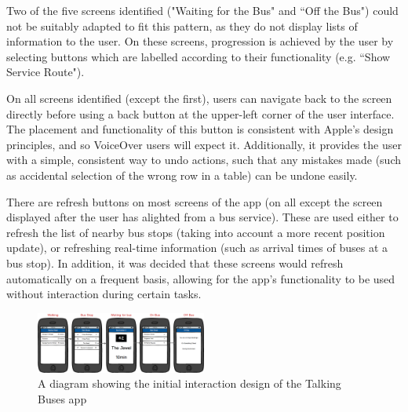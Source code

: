 \documentclass[10pt,twocolumn]{article}
\begin{document}
Two of the five screens identified ("Waiting for the Bus" and ``Off the Bus") could not be suitably adapted to fit this pattern, as they do not display lists of information to the user. On these screens, progression is achieved by the user by selecting buttons which are labelled according to their functionality (e.g. ``Show Service Route").

On all screens identified (except the first), users can navigate back to the screen directly before using a back button at the upper-left corner of the user interface. The placement and functionality of this button is consistent with Apple's design principles, and so VoiceOver users will expect it. Additionally, it provides the user with a simple, consistent way to undo actions, such that any mistakes made (such as accidental selection of the wrong row in a table) can be undone easily.

There are refresh buttons on most screens of the app (on all except the screen displayed after the user has alighted from a bus service). These are used either to refresh the list of nearby bus stops (taking into account a more recent position update), or refreshing real-time information (such as arrival times of buses at a bus stop).  In addition, it was decided that these screens would refresh automatically on a frequent basis, allowing for the app's functionality to be used without interaction during certain tasks.

\begin{figure}[htbp]
  \centering
    \includegraphics[width=0.5\textwidth]{interaction}
    \caption{A diagram showing the initial interaction design of the Talking Buses app}
\end{figure}
\end{document}
